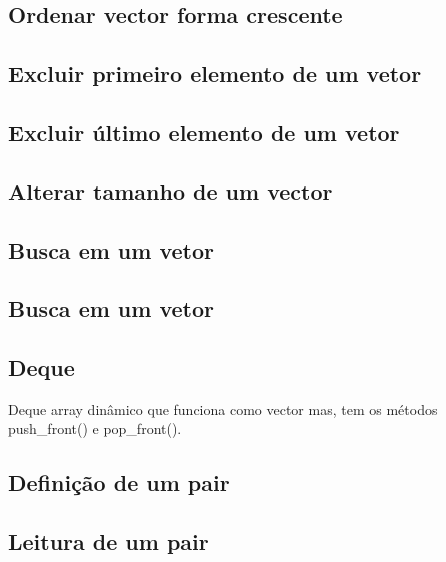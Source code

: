 \documentclass[a4paper,12pt]{article}
\begin{document}
\subsection{Ordenar vector forma crescente}

\subsection{Excluir primeiro elemento de um vetor}

\subsection{Excluir último elemento de um vetor}

\subsection{Alterar tamanho de um vector}

\subsection{Busca em um vetor}

\subsection{Busca em um vetor}

\subsection{Deque}
\indent Deque array dinâmico que funciona como vector mas, tem os métodos push\_front() e pop\_front().

\subsection{Definição de um pair}

\subsection{Leitura de um pair}
\end{document}
